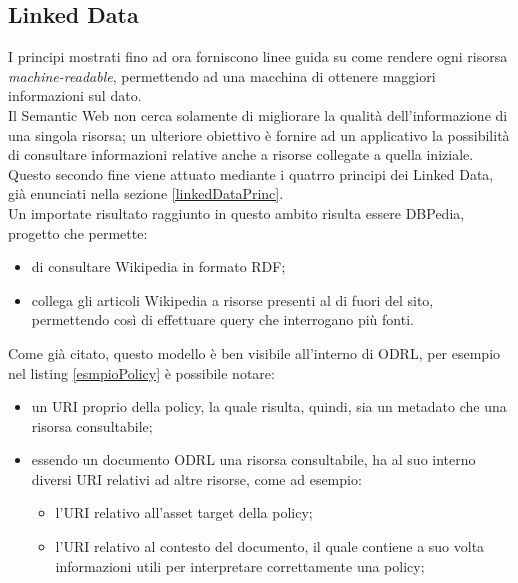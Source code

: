\documentclass[12pt,a4paper,twoside]{book}
\begin{document}
\subsection{Linked Data}
I principi mostrati fino ad ora forniscono linee guida su come rendere ogni risorsa \textit{machine-readable}, permettendo ad una macchina di ottenere maggiori informazioni sul dato.\\
Il Semantic Web non cerca solamente di migliorare la qualità dell'informazione di una singola risorsa; un ulteriore obiettivo è fornire ad un applicativo la possibilità di consultare informazioni relative anche a risorse collegate a quella iniziale.\\
Questo secondo fine viene attuato mediante i quatrro principi dei Linked Data, già enunciati nella sezione \ref{linkedDataPrinc}.\\
Un importate risultato raggiunto in questo ambito risulta essere DBPedia\cite{dbpedia}, progetto che permette:
\begin{itemize}
	\item di consultare Wikipedia in formato RDF;
	\item collega gli articoli Wikipedia a risorse presenti al di fuori del sito, permettendo così di effettuare query che interrogano più fonti. 
\end{itemize}
Come già citato, questo modello è ben visibile all'interno di ODRL, per esempio nel listing \ref{esmpioPolicy} è possibile notare:
\begin{itemize}
	\item un URI proprio della policy, la quale risulta, quindi, sia un metadato che una risorsa consultabile;
	\item essendo un documento ODRL una risorsa consultabile, ha al suo interno diversi URI relativi ad altre risorse, come ad esempio:
	\begin{itemize}
		\item l'URI relativo all'asset target della policy;
		\item l'URI relativo al contesto del documento, il quale contiene a suo volta informazioni utili per interpretare correttamente una policy;
	\end{itemize}
\end{itemize}
\end{document}
